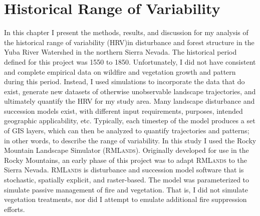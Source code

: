 
\chapter{Historical Range of Variability}
\label{ch:hrv}

In this chapter I present the methods, results, and discussion for my analysis of the historical range of variability (HRV)in disturbance and forest structure in the Yuba River Watershed in the northern Sierra Nevada. The historical period defined for this project was 1550 to 1850. Unfortunately, I did not have consistent and complete empirical data on wildfire and vegetation growth and pattern during this period. Instead, I used simulations to incorporate the data that do exist, generate new datasets of otherwise unobservable landscape trajectories, and ultimately quantify the HRV for my study area. Many landscape disturbance and succession models exist, with different input requirements, purposes, intended geographic applicability, etc. Typically, each timestep of the model produces a set of GIS layers, which can then be analyzed to quantify trajectories and patterns; in other words, to describe the range of variability. In this study I used the Rocky Mountain Landscape Simulator (\textsc{RMLands}). Originally developed for use in the Rocky Mountains, an early phase of this project was to adapt \textsc{RMLands} to the Sierra Nevada. \textsc{RMLands} is disturbance and succession model software that is stochastic, spatially explicit, and raster-based. The model was parameterized to simulate passive management of fire and vegetation. That is, I did not simulate vegetation treatments, nor did I attempt to emulate additional fire suppression efforts.



